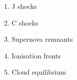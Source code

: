 \renewcommand\labelitemi{\textcolor{blue}{$\bullet$}}  
\renewcommand\normalcolor{\color{blue}}  %
\renewcommand\Black{\color{black}}        %
\renewcommand\labelitemii{\textcolor{DarkGreen}{$\star$}}  
\color{black}                             %



\LogoOff
\bgclear

\begin{enumerate}
\item J shocks \label{item:Jshocks}
\item C shocks \label{item:Cshocks}
\item Supernova remnants \label{item:SNRs}
\item Ionisation fronts \label{item:HIIs}
\item Cloud equilibrium \label{item:eq}
\end{enumerate} 


\renewcommand\labelitemi{\textcolor{blue}{$\bullet$}}  
\renewcommand\normalcolor{\color{blue}}  %


\renewcommand\labelitemi{\textcolor{blue}{$\bullet$}}  
\renewcommand\Black{\color{black}}        %
\renewcommand\labelitemii{\textcolor{DarkGreen}{$\star$}}  
\color{black}                             %

\LogoOff
\bgclear
\pagecolor{white}

